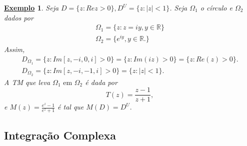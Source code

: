 \documentclass{article}
\newtheorem{example}{\underline{Exemplo}}[section]
\begin{document}
  \begin{example}
    Seja $D = \{z: Re z > 0\}, D^U = \{z: |z| < 1\} $. Seja $\Omega_1$ o c\'irculo e $\Omega_2$ dados por 
    \begin{align*}
      \Omega_1 = \{z: z = iy, y\in \mathbb{R}\} \\
      \Omega_2 = \{e^{iy}, y\in \mathbb{R}.\}
    \end{align*}
    Assim,
    \begin{align*}
      D_{\Omega_1} = \{z: Im[z, -i, 0, i] > 0\} = \{z: Im(iz) > 0\} = \{z: Re(z) > 0\}. \\
      D_{\Omega_2} = \{z: Im[z, -i, -1, i] > 0\} = \{z: |z| < 1\}.
    \end{align*}
    A TM que leva $\Omega_1\text{ em }\Omega_2$ \'e dada por
    $$
    T(z) = \frac{z-1}{z+1}, 
    $$
    e $M(z) = \frac{e^{z} - 1}{e^{z} + 1}$ \'e tal que $M(D) = D^U.$
  \end{example}

  \subsection{Integra\c c\~ao Complexa}
\end{document}
